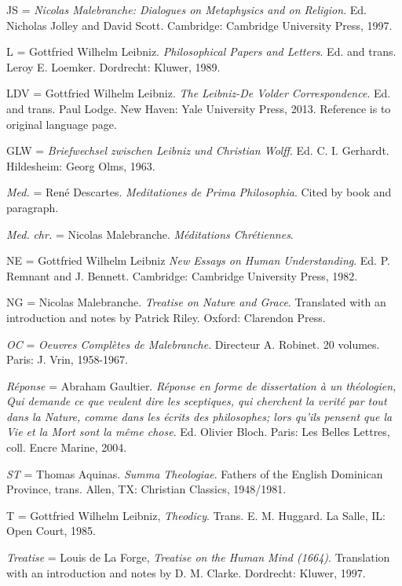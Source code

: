 \documentclass{article}
\begin{document}
JS = \emph{Nicolas Malebranche: Dialogues on Metaphysics and on
Religion}. Ed. Nicholas Jolley and David Scott. Cambridge: Cambridge
University Press, 1997.

L = Gottfried Wilhelm Leibniz. \emph{Philosophical Papers and Letters}.
Ed. and trans. Leroy E. Loemker. Dordrecht: Kluwer, 1989.

LDV = Gottfried Wilhelm Leibniz. \emph{The Leibniz-De Volder
Correspondence}. Ed. and trans. Paul Lodge. New Haven: Yale University
Press, 2013. Reference is to original language page.

GLW = \emph{Briefwechsel zwischen Leibniz und Christian Wolff}. Ed. C.
I. Gerhardt. Hildesheim: Georg Olms, 1963.

\emph{Med.} = René Descartes. \emph{Meditationes de Prima Philosophia}.
Cited by book and paragraph.

\emph{Med.} \emph{chr.} = Nicolas Malebranche. \emph{Méditations
Chrétiennes}.

NE = Gottfried Wilhelm Leibniz \emph{New Essays on Human Understanding}.
Ed. P. Remnant and J. Bennett. Cambridge: Cambridge University Press,
1982.

NG = Nicolas Malebranche. \emph{Treatise on Nature and Grace}.
Translated with an introduction and notes by Patrick Riley. Oxford:
Clarendon Press.

\emph{OC} = \emph{Oeuvres Complètes de Malebranche}. Directeur A.
Robinet. 20 volumes. Paris: J. Vrin, 1958-1967.

\emph{Réponse} = Abraham Gaultier. \emph{Réponse en forme de
dissertation à un théologien, Qui demande ce que veulent dire les
sceptiques, qui cherchent la verité par tout dans la Nature, comme dans
les écrits des philosophes; lors qu'ils pensent que la Vie et la Mort
sont la même chose}. Ed. Olivier Bloch. Paris: Les Belles Lettres, coll.
Encre Marine, 2004.

\emph{ST} = Thomas Aquinas. \emph{Summa Theologiae}. Fathers of the
English Dominican Province, trans. Allen, TX: Christian Classics,
1948/1981.

T = Gottfried Wilhelm Leibniz, \emph{Theodicy}. Trans. E. M. Huggard. La
Salle, IL: Open Court, 1985.

\emph{Treatise} = Louis de La Forge, \emph{Treatise on the Human Mind
(1664)}. Translation with an introduction and notes by D. M. Clarke.
Dordrecht: Kluwer, 1997.

\printbibliography
\end{document}
